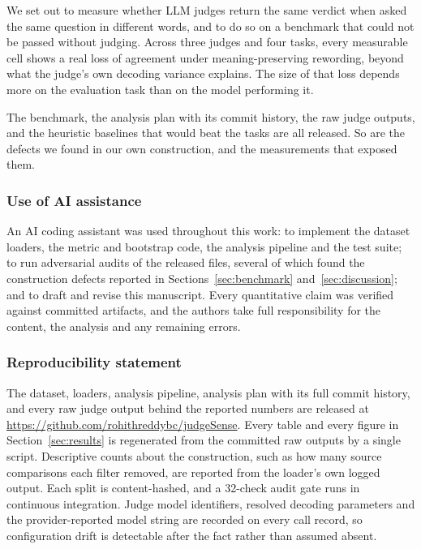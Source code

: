 \documentclass[11pt]{article}          %
\newif\ifblind
\begin{document}
We set out to measure whether LLM judges return the same verdict when asked the
same question in different words, and to do so on a benchmark that could not be
passed without judging. Across three judges and four tasks, every measurable cell
shows a real loss of agreement under meaning-preserving rewording, beyond what
the judge's own decoding variance explains. The size of that loss depends more on
the evaluation task than on the model performing it.

The benchmark, the analysis plan with its commit history, the raw judge outputs,
and the heuristic baselines that would beat the tasks are all released. So are
the defects we found in our own construction, and the measurements that exposed
them.

\subsubsection*{Use of AI assistance}
An AI coding assistant was used throughout this work: to implement the dataset
loaders, the metric and bootstrap code, the analysis pipeline and the test
suite; to run adversarial audits of the released files, several of which found
the construction defects reported in Sections~\ref{sec:benchmark}
and~\ref{sec:discussion}; and to draft and revise this manuscript. Every
quantitative claim was verified against committed artifacts, and the authors take
full responsibility for the content, the analysis and any remaining errors.

\subsubsection*{Reproducibility statement}
The dataset, loaders, analysis pipeline, analysis plan with its full commit
history, and every raw judge output behind the reported numbers are released at
\ifblind
\texttt{[repository URL withheld for review; the anonymised artifact accompanies
the submission]}\else\url{https://github.com/rohithreddybc/judgeSense}\fi.
Every table and every figure in Section~\ref{sec:results} is regenerated from the
committed raw outputs by a single script. Descriptive counts about the
construction, such as how many source comparisons each filter removed, are
reported from the loader's own logged output. Each split is content-hashed, and a 32-check audit gate runs
in continuous integration. Judge model identifiers, resolved decoding parameters
and the provider-reported model string are recorded on every call record, so
configuration drift is detectable after the fact rather than assumed absent.


\end{document}
